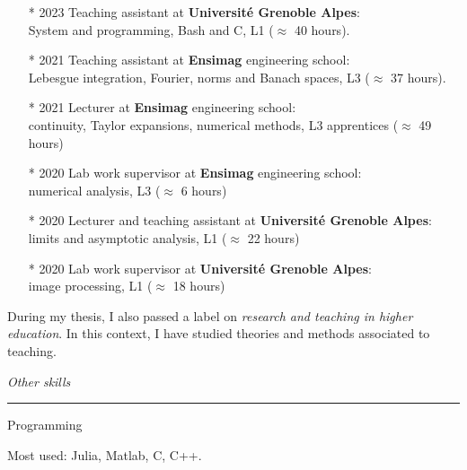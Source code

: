 \documentclass[a4paper,10pt]{article}
\begin{document}
	\begin{itemize}
	\setlength\itemsep{3mm}
	\item[*] 2023 Teaching assistant at \textbf{Université Grenoble Alpes}:\\
	System and programming, Bash and C, L1 ($\approx$ 40 hours).
	\item[*] 2021 Teaching assistant at \textbf{Ensimag} engineering school:\\
	Lebesgue integration, Fourier, norms and Banach spaces, L3 ($\approx$ 37 hours).
	\item[*] 2021 Lecturer at \textbf{Ensimag} engineering school:\\
	continuity, Taylor expansions, numerical methods, L3 apprentices ($\approx$ 49 hours)
	\item[*] 2020 Lab work supervisor at \textbf{Ensimag} engineering school:\\ numerical analysis, L3 ($\approx$ 6 hours)
	\item[*] 2020 Lecturer and teaching assistant at \textbf{Université Grenoble Alpes}:\\
	limits and asymptotic analysis, L1 ($\approx$ 22 hours)
	\item[*] 2020 Lab work supervisor at \textbf{Université Grenoble Alpes}:\\
	image processing, L1 ($\approx$ 18 hours)
	\end{itemize}

	During my thesis, I also passed a label on \emph{research and teaching in higher education}. In this context, I have studied theories and methods associated to teaching.

	\vspace{5mm}
	
	\noindent
	\textit{\Large \color{MyGray} \hspace{5mm} Other skills}
	\vspace{2mm}
	{\color{DefaultGray}\hrule height .1pt}
	\vspace{5mm}
	
	\noindent
	\begin{minipage}{0.20\textwidth}
		\color{MyGray} Programming
	\end{minipage}
	\hfill
	\begin{minipage}{0.70\textwidth}
		Most used: Julia, Matlab, C, C++.\\
	\end{minipage}\\
	\vspace{2mm}
	
\end{document}
